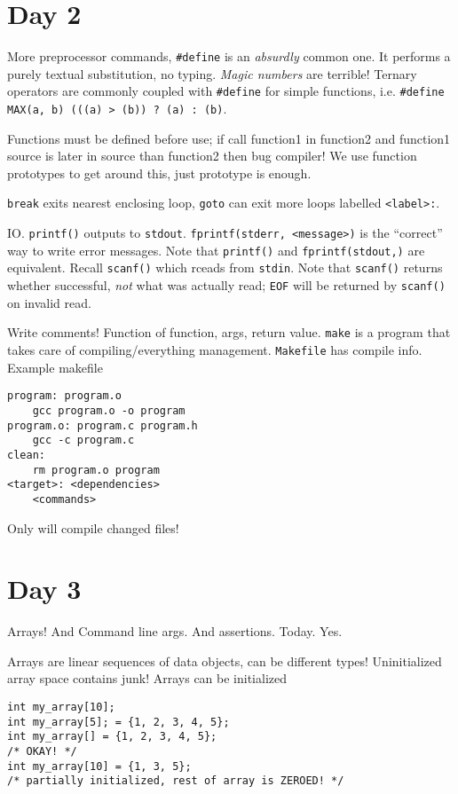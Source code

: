 \documentclass[10pt,landscape, twocolumn]{article}
\begin{document}
\section*{Day 2}

More preprocessor commands, \texttt{\#define} is an \emph{absurdly} common one. It performs a purely textual substitution, no typing. \emph{Magic numbers} are terrible! Ternary operators are commonly coupled with \texttt{\#define} for simple functions, i.e. \texttt{\#define MAX(a, b) (((a) > (b)) ? (a) : (b)}. 

Functions must be defined before use; if call function1 in function2 and function1 source is later in source than function2 then bug compiler! We use function prototypes to get around this, just prototype is enough. 

\texttt{break} exits nearest enclosing loop, \texttt{goto} can exit more loops labelled \texttt{<label>:}.

IO. \texttt{printf()} outputs to \texttt{stdout}. \texttt{fprintf(stderr, <message>)} is the ``correct'' way to write error messages. Note that \texttt{printf()} and \texttt{fprintf(stdout,)} are equivalent. Recall \texttt{scanf()} which rceads from \texttt{stdin}. Note that \texttt{scanf()} returns whether successful, \emph{not} what was actually read; \texttt{EOF} will be returned by \texttt{scanf()} on invalid read.

Write comments! Function of function, args, return value. \texttt{make} is a program that takes care of compiling/everything management. \texttt{Makefile} has compile info. Example makefile
\begin{verbatim}
program: program.o
    gcc program.o -o program
program.o: program.c program.h
    gcc -c program.c
clean:
    rm program.o program
<target>: <dependencies>
    <commands>
\end{verbatim}

Only will compile changed files!
\section*{Day 3}

Arrays! And Command line args. And assertions. Today. Yes.

Arrays are linear sequences of data objects, can be different types! Uninitialized array space contains junk! Arrays can be initialized
\begin{verbatim}
int my_array[10];
int my_array[5]; = {1, 2, 3, 4, 5};
int my_array[] = {1, 2, 3, 4, 5};
/* OKAY! */
int my_array[10] = {1, 3, 5};
/* partially initialized, rest of array is ZEROED! */
\end{verbatim}
\end{document}
